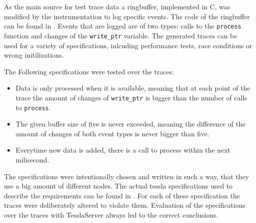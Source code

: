 
As the main source for test trace data a ringbuffer, implemented in C, was modified by the instrumentation to log specific events.
The code of the ringbuffer can be found in .
Events that are logged are of two types: calls to the \lstinline{process} function and changes of the \lstinline{write_ptr} variable.
The generated traces can be used for a variety of specifications, inlcuding performance tests, race conditions or wrong initilizations.

The Following specifications were tested over the traces:

\begin{itemize}
  \item Data is only processed when it is available, meaning that at each point of the trace the amount of changes of \lstinline{write_ptr} is bigger than the number of calls to \lstinline{process}.
  \item The given buffer size of five is never exceeded, meaning the difference of the amount of changes of both event types is never bigger than five.
  \item Everytime new data is added, there is a call to process within the next milisecond.
\end{itemize}

The specifications were intentionally chosen and written in such a way, that they use a big amount of different nodes.
The actual \gls{tessla} specifications used to describe the requirements can be found in .
For each of these specification the traces were deliberately altered to violate them.
Evaluation of the specifications over the traces with TesslaServer always led to the correct conclusions.
